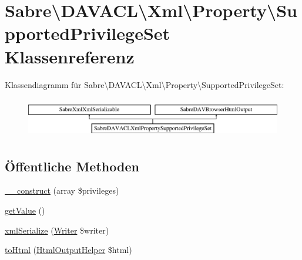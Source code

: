 \hypertarget{class_sabre_1_1_d_a_v_a_c_l_1_1_xml_1_1_property_1_1_supported_privilege_set}{}\section{Sabre\textbackslash{}D\+A\+V\+A\+CL\textbackslash{}Xml\textbackslash{}Property\textbackslash{}Supported\+Privilege\+Set Klassenreferenz}
\label{class_sabre_1_1_d_a_v_a_c_l_1_1_xml_1_1_property_1_1_supported_privilege_set}
Klassendiagramm für Sabre\textbackslash{}D\+A\+V\+A\+CL\textbackslash{}Xml\textbackslash{}Property\textbackslash{}Supported\+Privilege\+Set\+:\begin{figure}[H]
\begin{center}
\leavevmode
\includegraphics[height=1.761006cm]{class_sabre_1_1_d_a_v_a_c_l_1_1_xml_1_1_property_1_1_supported_privilege_set}
\end{center}
\end{figure}
\subsection*{Öffentliche Methoden}
\begin{DoxyCompactItemize}
\item 
\mbox{\hyperlink{class_sabre_1_1_d_a_v_a_c_l_1_1_xml_1_1_property_1_1_supported_privilege_set_ad013301ba8a64b204bf81bf36d50cd25}{\+\_\+\+\_\+construct}} (array \$privileges)
\item 
\mbox{\hyperlink{class_sabre_1_1_d_a_v_a_c_l_1_1_xml_1_1_property_1_1_supported_privilege_set_af9e45d301c36a7274c4807539ffa3e8b}{get\+Value}} ()
\item 
\mbox{\hyperlink{class_sabre_1_1_d_a_v_a_c_l_1_1_xml_1_1_property_1_1_supported_privilege_set_a5e25d40f4b72c1a0ec70d2137ec52b44}{xml\+Serialize}} (\mbox{\hyperlink{class_sabre_1_1_xml_1_1_writer}{Writer}} \$writer)
\item 
\mbox{\hyperlink{class_sabre_1_1_d_a_v_a_c_l_1_1_xml_1_1_property_1_1_supported_privilege_set_ade307197eaf785d53793154ac0a0f2e6}{to\+Html}} (\mbox{\hyperlink{class_sabre_1_1_d_a_v_1_1_browser_1_1_html_output_helper}{Html\+Output\+Helper}} \$html)
\end{DoxyCompactItemize}
